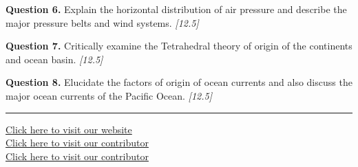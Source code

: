 \documentclass[11pt,a4paper]{article}
\newcommand{\pts}[1]{\hfill   \textit{[#1]}}
\begin{document}
\noindent   \textbf{Question 6.} Explain the horizontal distribution of air pressure and describe the major pressure belts and wind systems. \pts{12.5}

\medskip


\noindent   \textbf{Question 7.} Critically examine the Tetrahedral theory of origin of the continents and ocean basin. \pts{12.5}

\medskip


\noindent   \textbf{Question 8.} Elucidate the factors of origin of ocean currents and also discuss the major ocean currents of the Pacific Ocean. \pts{12.5}

\vfill\rule{\linewidth}{0.4pt}

\begin{center}\small
\href{https://bhu-exam.vercel.app/}{Click here to visit our website}\\[4pt]
\href{https://me-aryan.vercel.app/}{Click here to visit our contributor}\\[4pt]
\href{https://quashan-me.vercel.app/}{Click here to visit our contributor}
\end{center}
\end{document}
